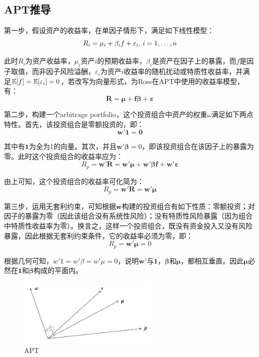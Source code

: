 \documentclass[11pt]{article}
\begin{document}
\begin{appendices}

\section{APT推导}

第一步，假设资产的收益率，在单因子情形下，满足如下线性模型：
\begin{equation*}
    R_i = \mu_i + \beta_i f + \varepsilon_i ,\, i =1,\dots,n
\end{equation*}

此时$R_i$为资产收益率，$\mu_i$资产$i$的预期收益率，$\beta_i$是资产在因子上的暴露，而$f$是因子取值，而非因子风险溢酬，$\varepsilon_i$为资产$i$收益率的随机扰动或特质性收益率，并满足$\mathbb{E}[f]=\mathbb{E}[\varepsilon_i]=0$，若改写为向量形式，为Ross在APT中使用的收益率模型，有：
\begin{equation*}
    \bm{R} = \bm{\mu + f\beta + \varepsilon}
\end{equation*}

第二步，构建一个arbitrage portfolio，这个投资组合中资产的权重$\omega$满足如下两点特性。首先，该投资组合是零额投资的，即：
\begin{equation*}
    \bm{w' 1 = 0}
\end{equation*}

其中有$\bm{1}$为全为1的向量。其次，并且$\bm{w'\beta}=0$，即该投资组合在该因子上的暴露为零。此时这个投资组合的收益率应为：
\begin{equation*}
    R_p = \bm{w'R = w'\mu + w'\beta f + w'\varepsilon}
\end{equation*}

由上可知，这个投资组合的收益率可化简为：
\begin{equation*}
    R_p = \bm{w'R = w'\mu} 
\end{equation*}

第三步，运用无套利约束，可知根据$\bm{w}$构建的投资组合有如下性质：零额投资；对因子的暴露为零（因此该组合没有系统性风险）；没有特质性风险暴露（因为组合中特质性收益率为零）。换言之，这样一个投资组合，既没有资金投入又没有风险暴露，因此根据无套利约束条件，它的收益率必须为零，即：
\begin{equation*}
    R_p = \bm{w'\mu} = 0
\end{equation*}

根据几何可知，$w' 1 = w' \beta = w'\mu = 0$，说明$\bm{w'}$与$\bm{1}$，$\bm{\beta}$和$\bm{\mu}$，都相互垂直。因此$\bm{\mu}$必然在$\bm{1}$和$\bm{\beta}$构成的平面内。

\begin{figure}[H]
    \centering
    \includegraphics[width=0.6\textwidth]{fig/apt.jpg}
    \caption{APT}
    \label{fig:apt}
\end{figure}


\end{appendices}
\end{document}
